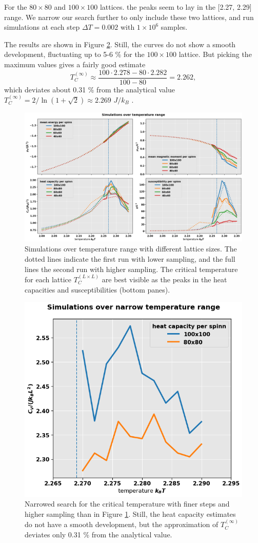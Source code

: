 \documentclass[]{article}
\begin{document}
For the $80 \times 80$ and $100 \times 100$ lattices. the peaks seem to lay in the [2.27, 2.29] range. We narrow our search further to only include these two lattices, and run simulations at each step $\Delta T = 0.002$ with $1 \times 10^6$ samples. 

The results are shown in Figure \ref{fig:temp-range-unall}. Still, the curves do not show a smooth development, fluctuating up to 5-6 \% for the $100 \times 100$ lattice. But picking the maximum values gives a fairly good estimate
\begin{equation}
	T_C^{(\infty)} \approx \frac{100 \cdot 2.278 - 80 \cdot 2.282}{100 - 80} = 2.262,
\end{equation}
which deviates about 0.31 \% from the analytical value $T_C^{(\infty)} = 2/\ln (1 + \sqrt{2}) \approx 2.269$ $J/k_B$ \cite{fys4150-p4}.

\begin{figure}[!h]
	\centering
	\includegraphics[width=1\linewidth]{./figs/temp-range-all.png}
	\caption{Simulations over temperature range with different lattice sizes. The dotted lines indicate the first run with lower sampling, and the full lines the second run with higher sampling. The critical temperature for each lattice $T_C^{(L \times L)}$ are best visible as the peaks in the heat capacities and susceptibilities (bottom panes).}
	\label{fig:temp-range-all}
\end{figure}


\begin{figure}[!h]
	\centering
	\includegraphics[width=.5\linewidth]{./figs/temp-range-unall.png}
	\caption{Narrowed search for the critical temperature with finer steps and higher sampling than in Figure \ref{fig:temp-range-all}. Still, the heat capacity estimates do not have a smooth development, but the approximation of $T_C^{(\infty)}$ deviates only 0.31 \% from the analytical value.}
	\label{fig:temp-range-unall}
\end{figure}
\end{document}
